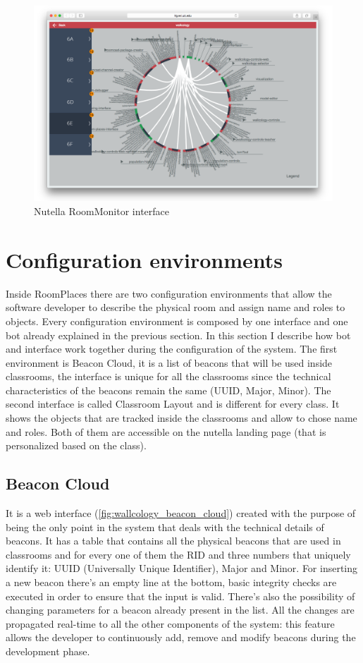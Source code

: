 \begin{figure}
\centering
\includegraphics[width=6in]{images/nutella-monitor.png}
\caption{Nutella RoomMonitor interface}
\label{fig:nutella_monitor}
\end{figure}

\section{Configuration environments}
Inside RoomPlaces there are two configuration environments that allow the software developer to describe the physical room and assign name and roles to objects. Every configuration environment is composed by one interface and one bot already explained in the previous section. In this section I describe how bot and interface work together during the configuration of the system. The first environment is Beacon Cloud, it is a list of beacons that will be used inside classrooms, the interface is unique for all the classrooms since the technical characteristics of the beacons remain the same (UUID, Major, Minor). The second interface is called Classroom Layout and is different for every class. It shows the objects that are tracked inside the classrooms and allow to chose name and roles. Both of them are accessible on the nutella landing page (that is personalized based on the class).

\subsection{Beacon Cloud}
It is a web interface (\ref{fig:wallcology_beacon_cloud}) created with the purpose of being the only point in the system that deals with the technical details of beacons. It has a table that contains all the physical beacons that are used in classrooms and for every one of them the RID and three numbers that uniquely identify it: UUID (Universally Unique Identifier), Major and Minor. For inserting a new beacon there's an empty line at the bottom, basic integrity checks are executed in order to ensure that the input is valid. There's also the possibility of changing parameters for a beacon already present in the list. All the changes are propagated real-time to all the other components of the system: this feature allows the developer to continuously add, remove and modify beacons during the development phase.


